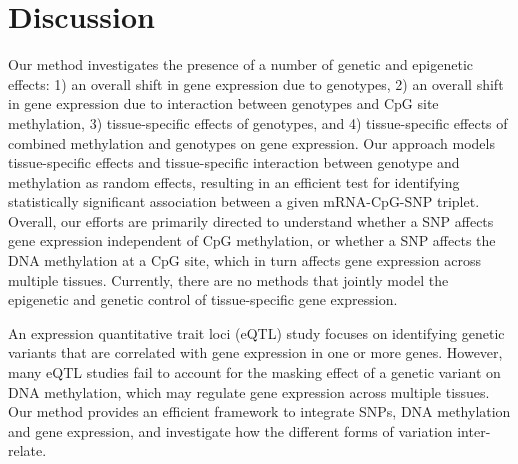 \documentclass[hidelinks]{article}
\begin{document}
%

\section{Discussion}

Our method investigates the presence of a number of genetic and epigenetic effects: 1) an overall shift in gene expression due to genotypes, 2) an overall shift in gene expression due to interaction between genotypes and CpG site methylation, 3) tissue-specific effects of genotypes,  and 4) tissue-specific effects of combined methylation and genotypes on gene expression. Our approach models tissue-specific effects and tissue-specific interaction between genotype and methylation as random effects, resulting in an efficient test for identifying statistically significant association between a given mRNA-CpG-SNP triplet. Overall, our efforts are primarily directed to understand whether a SNP affects gene expression independent of CpG methylation, or whether a SNP affects the DNA methylation at a CpG site, which in turn affects gene expression across multiple tissues. Currently, there are no methods that jointly model the epigenetic and genetic control of tissue-specific gene expression. 

An expression quantitative trait loci (eQTL) study focuses on identifying genetic variants that are correlated with gene expression in one or more genes. However, many eQTL studies fail to account for the masking effect of a genetic variant on DNA methylation, which may regulate gene expression across multiple tissues. Our method provides an efficient framework to integrate SNPs, DNA methylation and gene expression, and investigate how the different forms of variation inter-relate.
\end{document}
